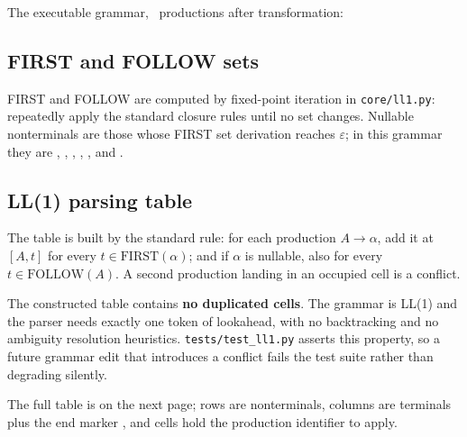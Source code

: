 The executable grammar, \ExecProductionCount\ productions after transformation:



\subsection{FIRST and FOLLOW sets}

FIRST and FOLLOW are computed by fixed-point iteration in
\texttt{core/ll1.py}: repeatedly apply the standard closure rules until no set changes.
Nullable nonterminals are those whose FIRST set derivation reaches $\varepsilon$; in this
grammar they are , , ,
, ,  and .



\subsection{LL(1) parsing table}

The table is built by the standard rule: for each production
$A \rightarrow \alpha$, add it at $[A, t]$ for every $t \in \mathrm{FIRST}(\alpha)$; and if
$\alpha$ is nullable, also for every $t \in \mathrm{FOLLOW}(A)$. A second production landing
in an occupied cell is a conflict.

\begin{keypoint}
The constructed table contains \textbf{no duplicated cells}. The grammar is LL(1) and the
parser needs exactly one token of lookahead, with no backtracking and no ambiguity
resolution heuristics. \texttt{tests/test\_ll1.py} asserts this property, so a future
grammar edit that introduces a conflict fails the test suite rather than degrading
silently.
\end{keypoint}

The full table is on the next page; rows are nonterminals, columns are terminals plus the
end marker \term{\$}, and cells hold the production identifier to apply.

\begin{landscape}

\end{landscape}
